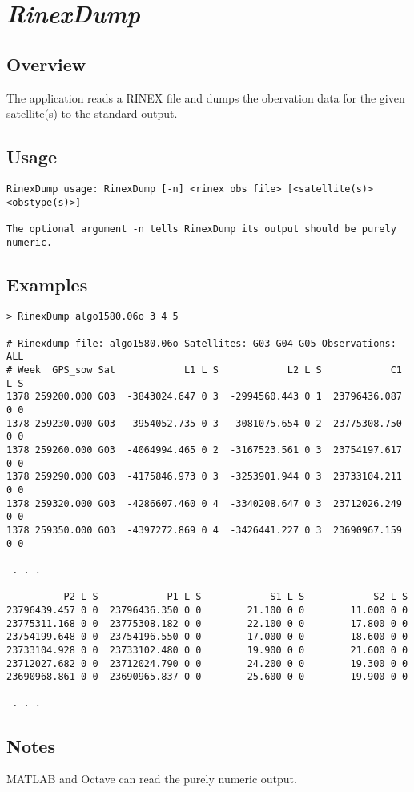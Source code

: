 %
%

\section{\emph{RinexDump}}
\subsection{Overview}
The application reads a RINEX file and dumps the obervation data for the given satellite(s) to the standard output.

\subsection{Usage}
\begin{\outputsize}
\begin{verbatim}
RinexDump usage: RinexDump [-n] <rinex obs file> [<satellite(s)> <obstype(s)>] 

The optional argument -n tells RinexDump its output should be purely numeric.
\end{verbatim}
\end{\outputsize}

\subsection{Examples}
\begin{\outputsize}
\begin{lstlisting}
> RinexDump algo1580.06o 3 4 5

# Rinexdump file: algo1580.06o Satellites: G03 G04 G05 Observations: ALL
# Week  GPS_sow Sat            L1 L S            L2 L S            C1 L S
1378 259200.000 G03  -3843024.647 0 3  -2994560.443 0 1  23796436.087 0 0
1378 259230.000 G03  -3954052.735 0 3  -3081075.654 0 2  23775308.750 0 0
1378 259260.000 G03  -4064994.465 0 2  -3167523.561 0 3  23754197.617 0 0
1378 259290.000 G03  -4175846.973 0 3  -3253901.944 0 3  23733104.211 0 0
1378 259320.000 G03  -4286607.460 0 4  -3340208.647 0 3  23712026.249 0 0
1378 259350.000 G03  -4397272.869 0 4  -3426441.227 0 3  23690967.159 0 0

 . . .

          P2 L S            P1 L S            S1 L S            S2 L S
23796439.457 0 0  23796436.350 0 0        21.100 0 0        11.000 0 0
23775311.168 0 0  23775308.182 0 0        22.100 0 0        17.800 0 0
23754199.648 0 0  23754196.550 0 0        17.000 0 0        18.600 0 0
23733104.928 0 0  23733102.480 0 0        19.900 0 0        21.600 0 0
23712027.682 0 0  23712024.790 0 0        24.200 0 0        19.300 0 0
23690968.861 0 0  23690965.837 0 0        25.600 0 0        19.900 0 0

 . . .
\end{lstlisting}
\end{\outputsize}

\subsection{Notes}
MATLAB and Octave can read the purely numeric output.

%
